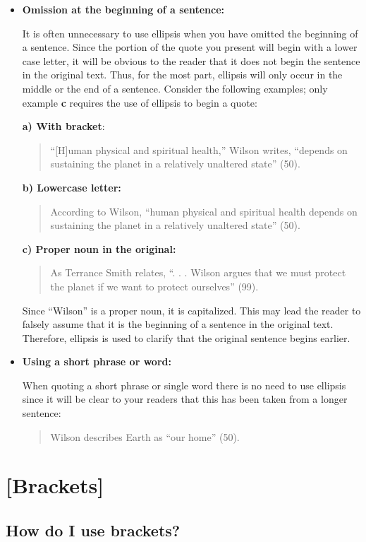 \begin{itemize} \item\textbf{Omission at the beginning of a sentence:}

It is often unnecessary to use ellipsis when you have omitted the beginning of a
sentence. Since the portion of the quote you present will begin with a lower
case letter, it will be obvious to the reader that it does not begin the
sentence in the original text. Thus, for the most part, ellipsis will only occur
in the middle or the end of a sentence. Consider the following examples; only
example \textbf{c} requires the use of ellipsis to begin a quote:

\textbf{a) With bracket}:  \begin{quote}“[H]uman physical and spiritual health,”
Wilson writes, “depends on sustaining the planet in a relatively unaltered
state” (50).\end{quote}

\textbf{b) Lowercase letter:} \begin{quote}According to Wilson, “human physical
and spiritual health depends on sustaining the planet in a relatively unaltered
state” (50).\end{quote}

\textbf{c) Proper noun in the original:} \begin{quote}As Terrance Smith relates, “. . .
Wilson argues that we must protect the planet if we want to protect ourselves”
(99).\end{quote}

Since “Wilson” is a proper noun, it is capitalized. This may lead the reader to falsely assume that it is the beginning of a sentence in the original text. Therefore, ellipsis is used to clarify that the original sentence begins earlier.

\item \textbf{Using a short phrase or word:}

When quoting a short phrase or single word there is no need to use ellipsis
since it will be clear to your readers that this has been taken from a longer
sentence:

\begin{quote} Wilson describes Earth as “our home” (50).\end{quote}

\end{itemize}

\hypertarget{brackets}{}
\section{[Brackets]} \subsection{How do I use brackets?}

